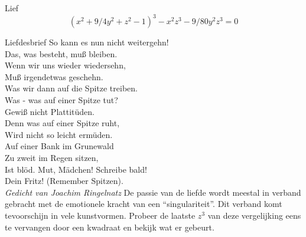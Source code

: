 \begin{surferPage}{Lief}
\[(x^2+ 9/4y^2	+ z^2- 1)^3- x^2z^3	- 9/80y^2z^3	= 0\]

\singlespacing
Liefdesbrief
\singlespacing
So kann es nun nicht weitergehn! \\
Das, was besteht, muß bleiben. \\
Wenn wir uns wieder wiedersehn, \\
Muß irgendetwas geschehn. \\
Was wir dann auf die Spitze treiben.\\ 
Was - was auf einer Spitze tut? \\
Gewiß nicht Plattitüden. \\
Denn was auf einer Spitze ruht, \\
Wird nicht so leicht ermüden. \\
Auf einer Bank im Grunewald \\
Zu zweit im Regen sitzen, \\
Ist blöd. Mut, Mädchen! Schreibe bald! \\
Dein Fritz! (Remember Spitzen). \\
 {\it Gedicht van Joachim Ringelnatz}
\singlespacing 
De passie van de liefde wordt meestal in verband gebracht met de emotionele kracht van een ``singulariteit''. Dit verband komt tevoorschijn in vele kunstvormen.
\singlespacing 
Probeer de laatste $z^3$ van deze vergelijking eens te vervangen door een kwadraat en bekijk wat er gebeurt.
\end{surferPage}
